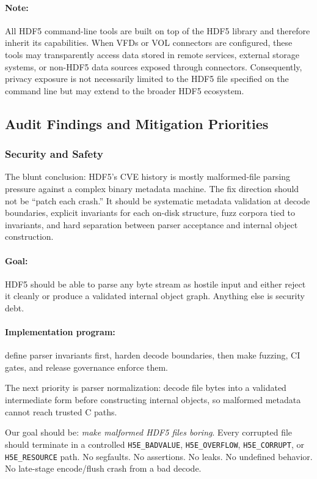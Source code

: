 \documentclass[../main.tex]{subfiles}
\begin{document}
\paragraph{Note:} All HDF5 command-line tools are built on top of the HDF5 library 
and therefore inherit its capabilities. When VFDs or VOL connectors are configured, these 
tools may transparently access data stored in remote services, external storage systems, 
or non-HDF5 data sources exposed through connectors. Consequently, privacy exposure 
is not necessarily limited to the HDF5 file specified on the command line but may extend to 
the broader HDF5 ecosystem.
\subsection{Audit Findings and Mitigation Priorities}

\subsubsection{Security and Safety}

The blunt conclusion: HDF5’s CVE history is mostly malformed-file
parsing pressure against a complex binary metadata machine.
The fix direction should not be “patch each crash.” It should be
systematic metadata validation at decode boundaries, explicit
invariants for each on-disk structure, fuzz corpora tied to invariants,
and hard separation between parser acceptance and internal object
construction.

\paragraph{Goal:} HDF5 should be able to parse any byte stream as hostile input
and either reject it cleanly or produce a validated internal object graph.
Anything else is security debt.

\paragraph{Implementation program:} define parser invariants first, harden decode
boundaries, then make fuzzing, CI gates, and release governance
enforce them.

The next priority is parser normalization: decode file bytes into a
validated intermediate form before constructing internal objects,
so malformed metadata cannot reach trusted C paths.

Our goal should be: \textit{make malformed HDF5 files boring}.
Every corrupted file should terminate in a controlled
\texttt{H5E\_BADVALUE}, \texttt{H5E\_OVERFLOW}, \texttt{H5E\_CORRUPT},
or \texttt{H5E\_RESOURCE} path. No segfaults. No assertions. No leaks.
No undefined behavior. No late-stage encode/flush crash from a bad
decode.
\end{document}
